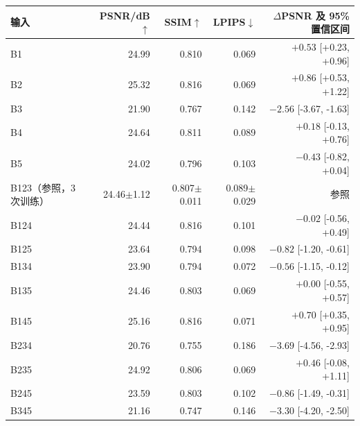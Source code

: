 \begin{tabular}{@{}lrrrr@{}}
\toprule
输入 & PSNR/dB$\uparrow$ & SSIM$\uparrow$ & LPIPS$\downarrow$ & $\Delta$PSNR 及 95\% 置信区间\\
\midrule
B1 & 24.99 & 0.810 & 0.069 & $+0.53$ [+0.23, +0.96] \\
B2 & 25.32 & 0.816 & 0.069 & $+0.86$ [+0.53, +1.22] \\
B3 & 21.90 & 0.767 & 0.142 & $-2.56$ [-3.67, -1.63] \\
B4 & 24.64 & 0.811 & 0.089 & $+0.18$ [-0.13, +0.76] \\
B5 & 24.02 & 0.796 & 0.103 & $-0.43$ [-0.82, +0.04] \\
B123（参照，3 次训练） & 24.46$\pm$1.12 & 0.807$\pm$0.011 & 0.089$\pm$0.029 & 参照 \\
B124 & 24.44 & 0.816 & 0.101 & $-0.02$ [-0.56, +0.49] \\
B125 & 23.64 & 0.794 & 0.098 & $-0.82$ [-1.20, -0.61] \\
B134 & 23.90 & 0.794 & 0.072 & $-0.56$ [-1.15, -0.12] \\
B135 & 24.46 & 0.803 & 0.069 & $+0.00$ [-0.55, +0.57] \\
B145 & 25.16 & 0.816 & 0.071 & $+0.70$ [+0.35, +0.95] \\
B234 & 20.76 & 0.755 & 0.186 & $-3.69$ [-4.56, -2.93] \\
B235 & 24.92 & 0.806 & 0.069 & $+0.46$ [-0.08, +1.11] \\
B245 & 23.59 & 0.803 & 0.102 & $-0.86$ [-1.49, -0.31] \\
B345 & 21.16 & 0.747 & 0.146 & $-3.30$ [-4.20, -2.50] \\
\bottomrule
\end{tabular}
